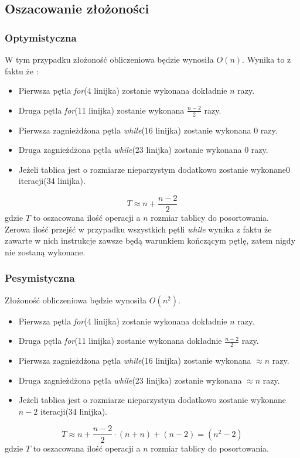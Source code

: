 \subsection*{Oszacowanie złożoności}
\subsubsection*{Optymistyczna}
W tym przypadku złożoność obliczeniowa będzie wynosiła $O(n)$.
Wynika to z faktu że :
\begin{itemize}
\item   Pierwsza pętla \textit{for}(4 linijka) zostanie wykonana dokładnie $n$ razy.
\item Druga pętla \textit{for}(11 linijka) zostanie wykonana $\frac{n-2}{2}$ razy.
\item Pierwsza zagnieżdżona pętla \textit{while}(16 linijka) zostanie wykonana $0$ razy.
\item Druga zagnieżdżona pętla \textit{while}(23 linijka) zostanie wykonana $0$ razy.
\item Jeżeli tablica jest o rozmiarze nieparzystym dodatkowo zostanie wykonane$ 0$ iteracji(34 linijka).
\end{itemize}
\begin{equation}
T \approx n + \frac{n-2}{2}
\end{equation}
gdzie $T$ to oszacowana ilość operacji a $n$ rozmiar tablicy do posortowania.\\
Zerowa ilość przejść w przypadku wszystkich pętli \textit{while} wynika z faktu że zawarte w nich instrukcje zawsze będą warunkiem kończącym pętlę, zatem nigdy nie zostaną wykonane.

\subsubsection*{Pesymistyczna}
Złożoność obliczeniowa będzie wynosiła $O(n^2)$.
\begin{itemize}
\item Pierwsza pętla \textit{for}(4 linijka) zostanie wykonana dokładnie $n$ razy.
\item Druga pętla \textit{for}(11 linijka) zostanie wykonana dokładnie $\frac{n-2}{2}$ razy.
\item Pierwsza zagnieżdżona pętla \textit{while}(16 linijka) zostanie wykonana $\approx n$ razy.
\item Druga zagnieżdżona pętla \textit{while}(23 linijka) zostanie wykonana $\approx n$ razy.
\item Jeżeli tablica jest o rozmiarze nieparzystym dodatkowo zostanie wykonane $n-2$ iteracji(34 linijka).
\end{itemize}
\begin{equation*}
T \approx n + \frac{n-2}{2}\cdot(n+n)+ (n-2)= (n^2-2)
\end{equation*}
gdzie $T$ to oszacowana ilość operacji a $n$ rozmiar tablicy do posortowania.\\


